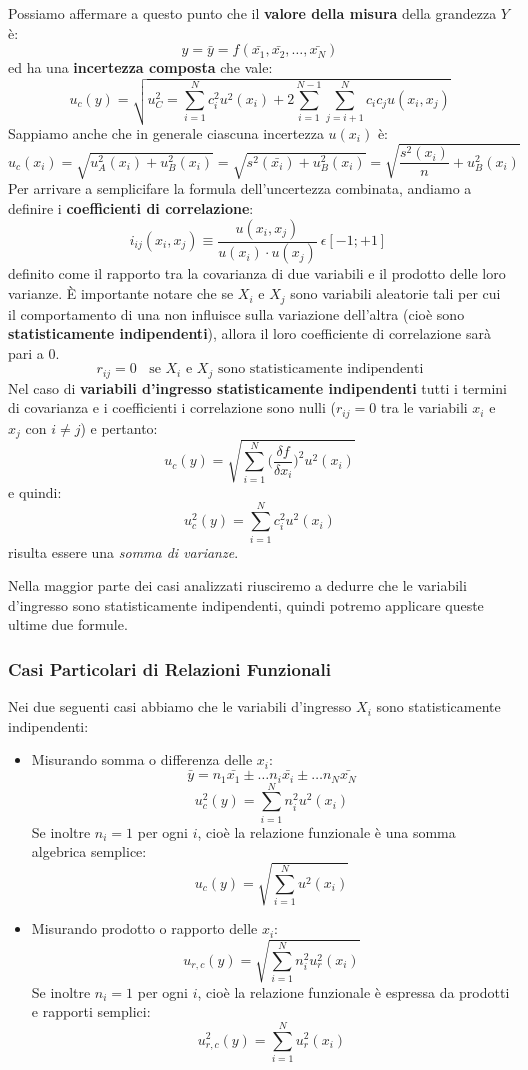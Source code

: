 \documentclass[a4paper,11pt]{report}
\begin{document}
Possiamo affermare a questo punto che il \textbf{valore della misura} della grandezza $Y$ è:
$$
  y = \bar{y} = f(\bar{x_1},\bar{x_2},\ldots,\bar{x_N})
$$ ed ha una \textbf{incertezza composta} che vale:
$$
  u_c(y) = \sqrt{  u_C^2 = \sum^N_{i = 1}c_i^2 u^2(x_i)+2\sum^{N-1}_{i = 1}\sum^{N}_{j = i +1}c_i c_j u(x_i,x_j)}
$$
Sappiamo anche che in generale ciascuna incertezza $u(x_i)$ è:
$$
  u_c(x_i) = \sqrt{u_A^2(x_i)+u_B^2(x_i)} = \sqrt{s^2(\bar{x_i})+u_B^2(x_i)} = \sqrt{\frac{s^2(x_i)}{n}+u_B^2(x_i)}
$$
Per arrivare a semplicifare la formula dell'uncertezza combinata, andiamo a definire i \textbf{coefficienti di correlazione}:
$$
  i_{ij}(x_i,x_j) \equiv \frac{u(x_i,x_j)}{u(x_i)\cdot u(x_j)}~\epsilon [-1;+1]~
$$ definito come il rapporto tra la covarianza di due variabili e il prodotto delle loro varianze. È importante notare che se $X_i$ e $X_j$ sono variabili aleatorie tali per cui il comportamento di una non influisce sulla variazione dell'altra (cioè sono \textbf{statisticamente indipendenti}), allora il loro coefficiente di correlazione sarà pari a 0.
$$
    r_{ij} = 0~~~~\text{se $X_i$ e $X_j$ sono statisticamente indipendenti}
$$
Nel caso di \textbf{variabili d'ingresso statisticamente indipendenti} tutti i termini di covarianza e i coefficienti i correlazione sono nulli ($r_{ij} = 0$ tra le variabili $x_i$ e $x_j$ con $i \neq j$) e pertanto:
$$
  u_c(y) = \sqrt{\sum^{N}_{i = 1}\Bigg(\frac{\delta f}{\delta x_i}\Bigg)^2 u^2(x_i)}
$$ e quindi:
\begin{equation}
  \label{incertezza composta: formula generale}  
    u^2_c(y) = \sum^{N}_{i = 1}c_i^2 u^2 (x_i)
\end{equation}  
risulta essere una \textit{somma di varianze}.

Nella maggior parte dei casi analizzati riusciremo a dedurre che le variabili d'ingresso sono statisticamente indipendenti, quindi potremo applicare queste ultime due formule.
\subsubsection{Casi Particolari di Relazioni Funzionali}
Nei due seguenti casi abbiamo che le variabili d'ingresso $X_i$ sono statisticamente indipendenti:
\begin{itemize}
  \item Misurando somma o differenza delle $x_i$:
  $$
    \bar{y} = n_1\bar{x_1}\pm\ldots n_i\bar{x_i}\pm\ldots n_N\bar{x_N}
  $$
  $$
    u^2_c(y) = \sum^N_{i = 1}n_i^2 u^2(x_i)
  $$
  Se inoltre $n_i = 1$ per ogni $i$, cioè la relazione funzionale è una somma algebrica semplice:
  $$
    u_c(y) = \sqrt{\sum^N_{i = 1}u^2(x_i)}
  $$
  \item Misurando prodotto o rapporto delle $x_i$:
  $$
    u_{r,c}(y) = \sqrt{\sum^{N}_{i = 1}n_i^2 u_r^2(x_i)}
  $$
    Se inoltre $n_i = 1$ per ogni $i$, cioè la relazione funzionale è espressa da prodotti e rapporti semplici:
    $$
      u_{r,c}^2(y) = \sum^{N}_{i = 1}u_r^2(x_i)
    $$
\end{itemize}
\end{document}
